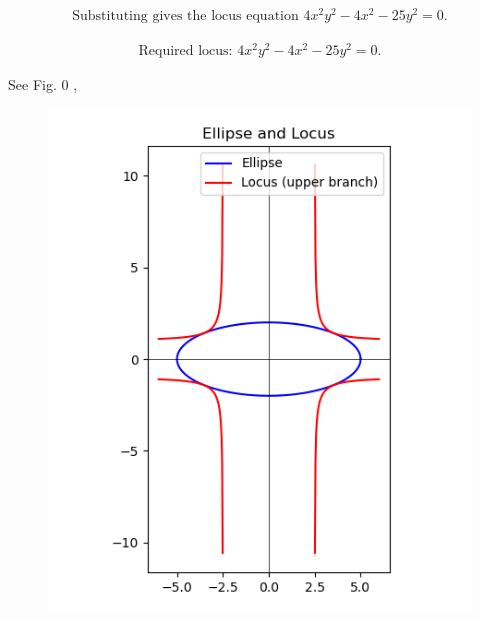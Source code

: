 \documentclass[journal]{IEEEtran}
\begin{document}
\begin{align}
\text{Substituting gives the locus equation }
4x^2y^2 - 4x^2 - 25y^2 = 0.
\end{align}

\begin{align}
\text{Required locus: } 4x^2y^2 - 4x^2 - 25y^2 = 0.
\end{align}


\newpage
See Fig. 0 ,
\begin{figure}[H]
\begin{center}
\includegraphics[width=0.6\columnwidth]{figs/fig.png}
\end{center}
\caption{}
\label{fig:Fig1}
\end{figure}
\end{document}
